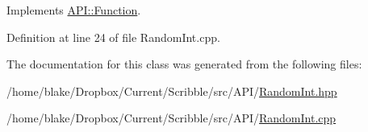 Implements \hyperlink{class_a_p_i_1_1_function_ae56761ad4c849c05e12cb4cd02583c77}{A\-P\-I\-::\-Function}.



Definition at line 24 of file Random\-Int.\-cpp.



The documentation for this class was generated from the following files\-:\begin{DoxyCompactItemize}
\item 
/home/blake/\-Dropbox/\-Current/\-Scribble/src/\-A\-P\-I/\hyperlink{_random_int_8hpp}{Random\-Int.\-hpp}\item 
/home/blake/\-Dropbox/\-Current/\-Scribble/src/\-A\-P\-I/\hyperlink{_random_int_8cpp}{Random\-Int.\-cpp}\end{DoxyCompactItemize}
